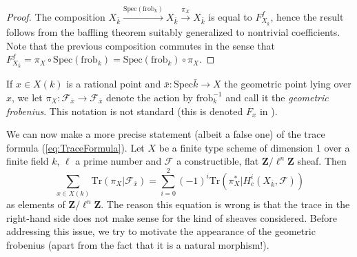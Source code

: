 \begin{proof}
The composition $X_{\bar k} \xrightarrow{\text{Spec}(\text{frob}_k)} X_{\bar k} 
\xrightarrow{\pi_X} X_{\bar k}$ is equal to $F_{X_{\bar k}}^f$, hence the 
result follows from the baffling theorem suitably generalized to nontrivial 
coefficients. Note that the previous composition commutes in the sense that 
$F_{X_{\bar k}}^f = \pi_X \circ \text{Spec}(\text{frob}_k) = 
\text{Spec}(\text{frob}_k) \circ \pi_X$.
\end{proof}

\begin{definition}
If $x \in X(k)$ is a rational point and $\bar x : \text{Spec} \bar k \to X$ the 
geometric point lying over $x$, we let $\pi_X : \mathcal{F}_{\bar x} \to 
\mathcal{F}_{\bar x}$ denote the action by $\text{frob}_k^{-1}$ and call it the 
\emph{geometric frobenius}. This notation is not standard (this is denoted 
$F_x$ in \cite{SGA4.5}).
\end{definition}

We can now make a more precise statement (albeit a false one) of the trace 
formula (\ref{eq:TraceFormula}). Let $X$ be a finite type scheme of dimension 1 
over a finite field $k$, $\ell$ a prime number and $\mathcal{F}$ a 
constructible, flat $\mathbf{Z}/\ell^n\mathbf{Z}$ sheaf. Then
$$
\sum_{x \in X(k)} \text{Tr}(\pi_X | \mathcal{F}_{\bar x}) = \sum_{i=0}^2 (-1)^i 
\text{Tr}(\pi_X^* | H^i_c(X_{\bar k}, \mathcal{F}))
$$
as elements of $\mathbf{Z}/\ell^n\mathbf{Z}$. The reason this equation is wrong 
is that the trace in the right-hand side does not make sense for the kind of 
sheaves considered. Before addressing this issue, we try to motivate the 
appearance of the geometric frobenius (apart from the fact that it is a natural 
morphism!). 

